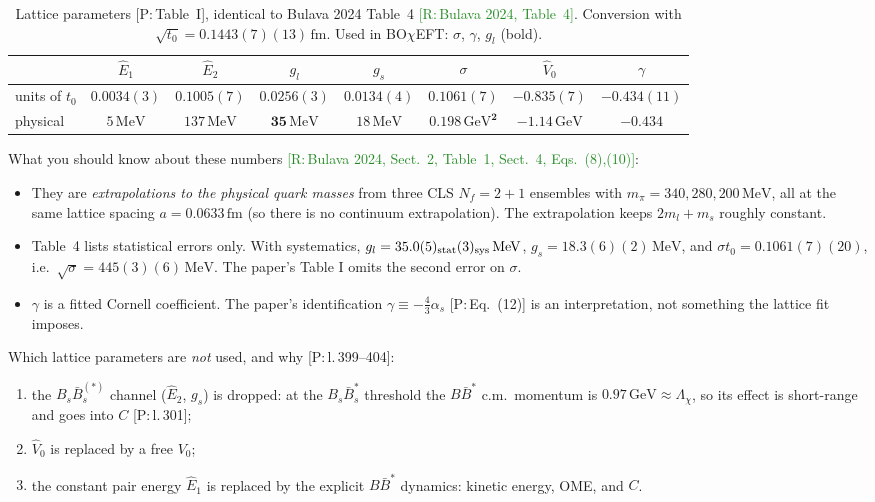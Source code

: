 \documentclass[11pt,a4paper]{article}
\newcommand{\tagP}[1]{\textcolor{blue!65!black}{\textsf{\small[P:\,#1]}}}
\newcommand{\tagR}[1]{\textcolor{ForestGreen}{\textsf{\small[R:\,#1]}}}
\newcommand{\BBst}{B\bar B^*}
\renewcommand{\BOchiEFT}{BO$\chi$EFT}
\renewcommand{\GeV}{\,\mathrm{GeV}}
\renewcommand{\MeV}{\,\mathrm{MeV}}
\newcommand{\fm}{\,\mathrm{fm}}
\begin{document}
\begin{table}[h]
\centering
\caption{Lattice parameters \tagP{Table~I}, identical to Bulava 2024 Table~4 \tagR{Bulava 2024, Table~4}. Conversion with $\sqrt{t_0}=0.1443(7)(13)\fm$. Used in \BOchiEFT: $\sigma$, $\gamma$, $g_l$ (bold).}
\label{tab:lattice}
\setlength{\tabcolsep}{4pt}\small
\begin{tabular}{lccccccc}
\toprule
& $\hat E_1$ & $\hat E_2$ & $g_l$ & $g_s$ & $\sigma$ & $\hat V_0$ & $\gamma$\\
\midrule
units of $t_0$ & $0.0034(3)$ & $0.1005(7)$ & $0.0256(3)$ & $0.0134(4)$ & $0.1061(7)$ & $-0.835(7)$ & $-0.434(11)$\\
physical & $5\MeV$ & $137\MeV$ & $\bm{35\MeV}$ & $18\MeV$ & $\bm{0.198\GeV^2}$ & $-1.14\GeV$ & $\bm{-0.434}$\\
\bottomrule
\end{tabular}
\end{table}

What you should know about these numbers \tagR{Bulava 2024, Sect.~2, Table~1, Sect.~4, Eqs.~(8),(10)}:
\begin{itemize}
\item They are \emph{extrapolations to the physical quark masses} from three CLS $N_f=2+1$ ensembles with $m_\pi=340,280,200\MeV$, all at the same lattice spacing $a=0.0633\fm$ (so there is no continuum extrapolation). The extrapolation keeps $2m_l+m_s$ roughly constant.
\item Table~4 lists statistical errors only. With systematics, $g_l=35.0(5)_{\rm stat}(3)_{\rm sys}\MeV$, $g_s=18.3(6)(2)\MeV$, and $\sigma t_0=0.1061(7)(20)$, i.e.\ $\sqrt\sigma=445(3)(6)\MeV$. The paper's Table I omits the second error on $\sigma$.
\item $\gamma$ is a fitted Cornell coefficient. The paper's identification $\gamma\equiv-\frac43\alpha_s$ \tagP{Eq.~(12)} is an interpretation, not something the lattice fit imposes.
\end{itemize}
Which lattice parameters are \emph{not} used, and why \tagP{l.\,399--404}:
\begin{enumerate}[label=(\roman*)]
\item the $B_s\bar B_s^{(*)}$ channel ($\hat E_2$, $g_s$) is dropped: at the $B_s\bar B_s^*$ threshold the $\BBst$ c.m.\ momentum is $0.97\GeV\approx\Lambda_\chi$, so its effect is short-range and goes into $C$ \tagP{l.\,301};
\item $\hat V_0$ is replaced by a free $V_0$;
\item the constant pair energy $\hat E_1$ is replaced by the explicit $\BBst$ dynamics: kinetic energy, OME, and $C$.
\end{enumerate}
\end{document}
